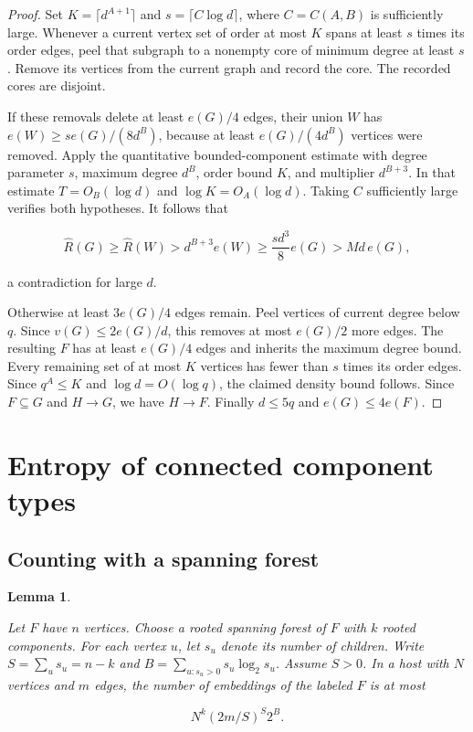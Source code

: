 \documentclass[11pt]{amsart}
\newtheorem{lemma}[theorem]{Lemma}
\theoremstyle{definition}
\theoremstyle{remark}
\numberwithin{equation}{section}
\begin{document}
\begin{proof}

Set $K=\lceil d^{A+1}\rceil $ and $ s=\lceil C\log d\rceil $, where $ C=C(A,B)$ is sufficiently large. Whenever a current vertex set of order at most $ K $ spans at least $ s $ times its order edges, peel that subgraph to a nonempty core of minimum degree at least $ s$. Remove its vertices from the current graph and record the core. The recorded cores are disjoint.

If these removals delete at least $e(G)/4$ edges, their union $ W $ has $ e(W)\ge s e(G)/(8d^B)$, because at least $ e(G)/(4d^B)$ vertices were removed. Apply the quantitative bounded-component estimate with degree parameter $ s $, maximum degree $ d^B $, order bound $ K $, and multiplier $ d^{B+3}$. In that estimate $ T=O_B(\log d)$ and $\log K=O_A(\log d)$. Taking $ C$ sufficiently large verifies both hypotheses. It follows that

\begin{equation}
\widehat R(G)\ge\widehat R(W)>d^{B+3}e(W)
\ge \frac{s d^3}{8}e(G)>Md\,e(G),
\end{equation}

a contradiction for large $d$.

Otherwise at least $3e(G)/4$ edges remain. Peel vertices of current degree below $ q $. Since $ v(G)\le2e(G)/d $, this removes at most $ e(G)/2$ more edges. The resulting $ F $ has at least $ e(G)/4$ edges and inherits the maximum degree bound. Every remaining set of at most $ K $ vertices has fewer than $ s $ times its order edges. Since $ q^A\le K $ and $\log d=O(\log q)$, the claimed density bound follows. Since $F\subseteq G$ and $H\to G$, we have $H\to F$. Finally $ d\le5q $ and $ e(G)\le4e(F)$.

\end{proof}

\section{Entropy of connected component types}\label{sec:entropy}

\subsection{Counting with a spanning forest}

\begin{lemma}\label{lem:forest}

Let $F $ have $ n $ vertices. Choose a rooted spanning forest of $ F $ with $ k $ rooted components. For each vertex $ u $, let $ s_u $ denote its number of children. Write $ S=\sum_us_u=n-k $ and $ B=\sum_{u:s_u>0}s_u\log_2s_u $. Assume $ S>0$. In a host with $ N $ vertices and $ m $ edges, the number of embeddings of the labeled $ F$ is at most

\begin{equation}
N^k(2m/S)^S2^B.
\end{equation}

\end{lemma}
\end{document}
